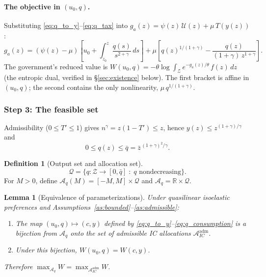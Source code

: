 \documentclass[12pt,a4paper]{article}
\theoremstyle{definition}
\newtheorem{definition}{Definition}[section]
\theoremstyle{plain}
\newtheorem{lemma}{Lemma}[section]
\theoremstyle{remark}
\newcommand{\R}{\mathbb{R}}
\newcommand{\zbar}{\bar{z}}
\newcommand{\zlow}{z_{\scriptscriptstyle 0}}
\newcommand{\calU}{\mathcal{U}}
\newcommand{\calZ}{\mathcal{Z}}
\newcommand{\calA}{\mathcal{A}}
\begin{document}
\paragraph{The objective in $(u_0, q)$.}
Substituting
\eqref{eq:q_to_y}--\eqref{eq:q_tax} into $g_a(z) =
\psi(z)\,\calU(z) + \mu\,T(y(z))$:
\begin{equation}
\label{eq:g_uq}
  g_a(z)
  = (\psi(z) - \mu)\!\left[u_0
    + \int_{\zlow}^z \frac{q(s)}{s^{2+\gamma}}\,ds\right]
  + \mu\!\left[q(z)^{1/(1+\gamma)}
    - \frac{q(z)}{(1{+}\gamma)\,z^{1+\gamma}}\right].
\end{equation}
The government's reduced value is
$W(u_0, q) = -\theta\log\!\int_\calZ
e^{-g_a(z)/\theta}\,f(z)\,dz$
(the entropic dual, verified in \S\ref{sec:existence}
below).  The first bracket is affine in $(u_0, q)$; the
second contains the only nonlinearity,
$\mu\,q^{1/(1+\gamma)}$.


\subsubsection{Step 3: The feasible set}

Admissibility ($0 \leq T' \leq 1$) gives
$n^\gamma = z(1-T') \leq z$, hence
$y(z) \leq z^{(1+\gamma)/\gamma}$ and
\begin{equation}
\label{eq:q_bound}
  0 \leq q(z) \leq \bar q
  = \zbar^{\,(1+\gamma)^2/\gamma}.
\end{equation}

\begin{definition}[Output set and allocation set]
\label{def:A_q}
\[
  \mathcal{Q} = \bigl\{q: \calZ \to [0, \bar q]
  \;:\; q \text{ nondecreasing}\bigr\}.
\]
For $M > 0$, define
$\calA_q(M) = [-M, M] \times \mathcal{Q}$ and
$\calA_q = \R \times \mathcal{Q}$.
\end{definition}

\begin{lemma}[Equivalence of parameterizations]
\label{lem:Aq_equiv}
Under quasilinear isoelastic preferences and
Assumptions~\ref{as:bounded}--\ref{as:admissible}:
\begin{enumerate}[label=(\roman*)]
\item The map $(u_0, q) \mapsto (c, y)$ defined by
  \eqref{eq:q_to_y}--\eqref{eq:q_consumption} is a
  bijection from $\calA_q$ onto the set of admissible
  IC allocations $\calA_{IC}^{\mathrm{adm}}$.
\item Under this bijection, $W(u_0, q) = W(c, y)$.
\end{enumerate}
Therefore $\max_{\calA_q} W = \max_{\calA_{IC}^{\mathrm{adm}}} W$.
\end{lemma}
\end{document}
